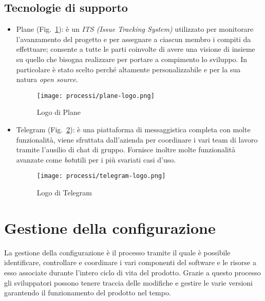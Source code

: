 \subsection{Tecnologie di supporto}
\begin{itemize}
    \item Plane (Fig.~\ref{fig:logo-plane}): è un \emph{ITS (Issue Tracking System)} utilizzato per monitorare l'avanzamento del progetto e per assegnare a ciascun membro i compiti da effettuare; consente a tutte le parti coinvolte di avere una visione di insieme su quello che bisogna realizzare per portare a compimento lo sviluppo. In particolare è stato scelto perché altamente personalizzabile e per la sua natura \emph{open source}\glsfirstoccur.
    
    \begin{figure}[!h] 
        \centering 
        \texttt{[image: processi/plane-logo.png]} 
        \caption{Logo di Plane}
        \label{fig:logo-plane}
      \end{figure}

    \item Telegram (Fig.~\ref{fig:logo-telegram}): è una piattaforma di messaggistica completa con molte funzionalità, viene sfruttata dall'azienda per coordinare i vari team di lavoro tramite l'ausilio di chat di gruppo. Fornisce inoltre molte funzionalità avanzate come \emph{bot}\glsfirstoccur utili per i più svariati casi d'uso.
    
    \begin{figure}[!h] 
        \centering 
        \texttt{[image: processi/telegram-logo.png]} 
        \caption{Logo di Telegram}
        \label{fig:logo-telegram}
      \end{figure}
\end{itemize}

\newpage

\section{Gestione della configurazione}
La gestione della configurazione è il processo tramite il quale è possibile identificare, controllare e coordinare i vari componenti del software e le risorse a esso associate durante l'intero ciclo di vita del prodotto. Grazie a questo processo gli sviluppatori possono tenere traccia delle modifiche e gestire le varie versioni garantendo il funzionamento del prodotto nel tempo.



